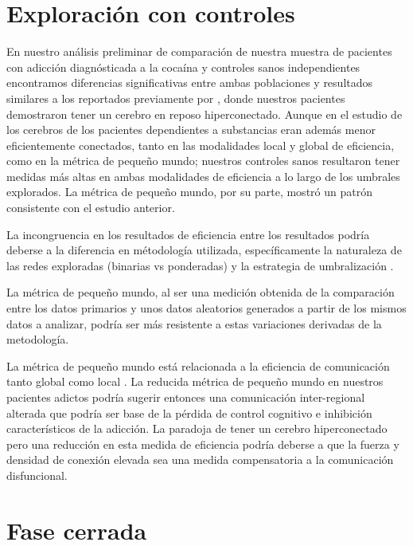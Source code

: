 \section{Exploración con controles}
En nuestro análisis preliminar de comparación de nuestra muestra de pacientes con adicción diagnósticada a la cocaína y controles sanos independientes encontramos diferencias significativas entre ambas poblaciones y resultados similares a los reportados previamente por \textcite{Wang2015a}, donde nuestros pacientes demostraron tener un cerebro en reposo hiperconectado. Aunque en el estudio de \textcite{Wang2015a} los cerebros de los pacientes dependientes a substancias eran además menor eficientemente conectados, tanto en las modalidades local y global de eficiencia, como en la métrica de pequeño mundo; nuestros controles sanos resultaron tener medidas más altas en ambas modalidades de eficiencia a lo largo de los umbrales explorados. La métrica de pequeño mundo, por su parte, mostró un patrón consistente con el estudio anterior. \par
La incongruencia en los resultados de eficiencia entre los resultados podría deberse a la diferencia en métodología utilizada, específicamente la naturaleza de las redes exploradas (binarias vs ponderadas) y la estrategia de umbralización \parencite{Hallquist2018}. \par
La métrica de pequeño mundo, al ser una medición obtenida de la comparación entre los datos primarios y unos datos aleatorios generados a partir de los mismos datos a analizar, podría ser más resistente a estas variaciones derivadas de la metodología. \par
La métrica de pequeño mundo está relacionada a la eficiencia de comunicación tanto global como local \parencite{Latora2001}. La reducida métrica de pequeño mundo en nuestros pacientes adictos podría sugerir entonces una comunicación inter-regional alterada que podría ser base de la pérdida de control cognitivo e inhibición característicos de la adicción. La paradoja de tener un cerebro hiperconectado pero una reducción en esta medida de eficiencia podría deberse a que la fuerza y densidad de conexión elevada sea una medida compensatoria a la comunicación disfuncional.

\section{Fase cerrada}
